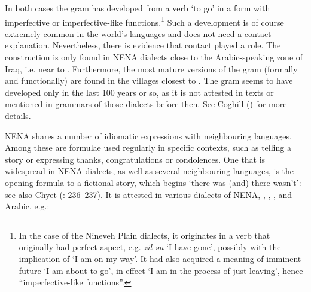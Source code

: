 \documentclass[output=paper]{langsci/langscibook}
\begin{document}
In both cases the gram has developed from a verb ‘to go’ in a form with imperfective or imperfective-like functions.\footnote{In the case of the Nineveh Plain dialects, it originates in a verb that originally had perfect aspect, e.g. \textit{zil-ən} ‘I have gone’, possibly with the implication of ‘I am on my way’. It had also acquired a meaning of imminent {future} ‘I am about to go’, in effect ‘I am in the process of just leaving’, hence ``imperfective-like functions''.} Such a development is of course extremely common in the world’s languages and does not need a contact explanation. Nevertheless, there is evidence that contact played a role. The construction is only found in NENA dialects close to the Arabic-speaking zone of Iraq, i.e. near to . Furthermore, the most mature versions of the gram (formally and functionally) are found in the villages closest to . The gram seems to have developed only in the last 100 years or so, as it is not attested in texts or mentioned in grammars of those dialects before then. See Coghill (\citeyear{Coghill2010,Coghill2012}) for more details.

NENA shares a number of {idiomatic} expressions with neighbouring languages. Among these are formulae used regularly in specific contexts, such as telling a story or expressing thanks, congratulations or condolences. One that is widespread in NENA dialects, as well as several neighbouring languages, is the opening formula to a fictional story, which begins ‘there was (and) there wasn’t’: see also Chyet (\citeyear{Chyet1995}: 236–237). It is attested in various dialects of NENA, , , ,  and Arabic, e.g.:
\end{document}
